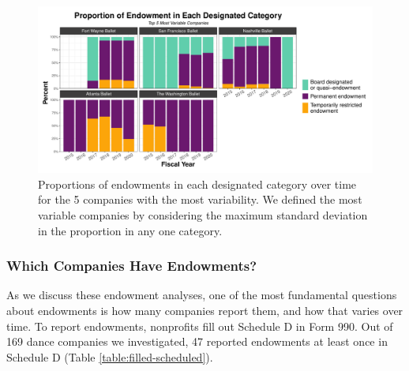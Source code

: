 \documentclass[Dance Data
Project,article,submit,moreauthors,pdftex]{mdpi}
\begin{document}
\begin{figure}[H]
\includegraphics[width=0.9\linewidth,]{../images/prop_endowment_type_most_variable} \caption{\label{fig:prop-most-variable} Proportions of endowments in each designated category over time for the 5 companies with the most variability. We defined the most variable companies by considering the maximum standard deviation in the proportion in any one category.}\label{fig:proportion-endowment-categories-most-variable}
\end{figure}

\hypertarget{which-companies-have-endowments}{%
\subsubsection{Which Companies Have
Endowments?}\label{which-companies-have-endowments}}

As we discuss these endowment analyses, one of the most fundamental
questions about endowments is how many companies report them, and how
that varies over time. To report endowments, nonprofits fill out
Schedule D in Form 990. Out of 169 dance companies we investigated, 47
reported endowments at least once in Schedule D (Table
\ref{table:filled-scheduled}).
\end{document}
